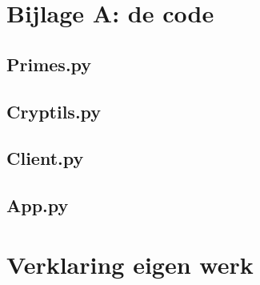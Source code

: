 \documentclass{report} %
\begin{document}
\chapter{Bijlage A: de code}
\section{Primes.py}


\section{Cryptils.py}


\section{Client.py}


\section{App.py}


\chapter{Verklaring eigen werk}
\end{document}
